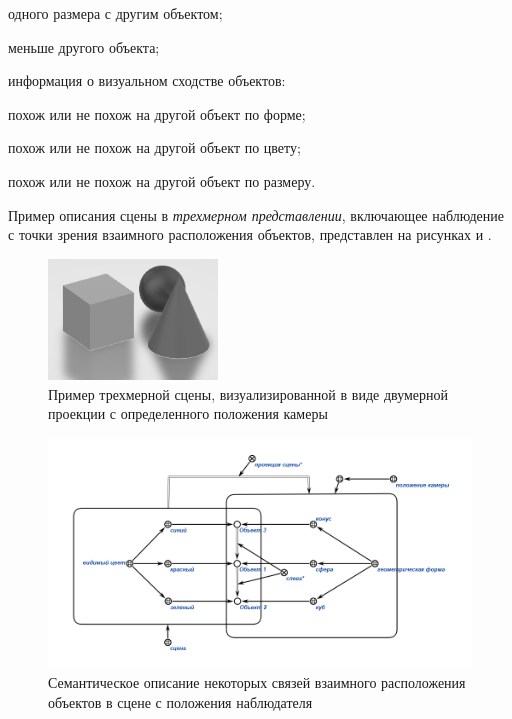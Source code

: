 \begin{textitemize}
\begin{textitemize}
        \item одного размера с другим объектом;
        \item меньше другого объекта;
    \end{textitemize}
    \item информация о визуальном сходстве объектов:
    \begin{textitemize}
        \item похож или не похож на другой объект по форме;
        \item похож или не похож на другой объект по цвету;
        \item похож или не похож на другой объект по размеру.
    \end{textitemize}
\end{textitemize}


Пример описания сцены в \textit{трехмерном представлении}, включающее наблюдение с точки зрения взаимного расположения объектов, представлен на рисунках \textit{} и \textit{}.

\begin{figure}[H]
    \includegraphics[scale=0.8, width=0.4\textwidth]{author/part4/figures/scene-example.png}
    \caption{Пример трехмерной сцены, визуализированной в виде двумерной проекции с определенного положения камеры}
    \label{fig:scene-example}
\end{figure}

\begin{figure}[H]
    \includegraphics[scale=0.8, width=1.0\textwidth]{author/part4/figures/scene-description.png}
    \caption{Семантическое описание некоторых связей взаимного расположения объектов в сцене с положения наблюдателя}
    \label{fig:scene-description}
\end{figure}

